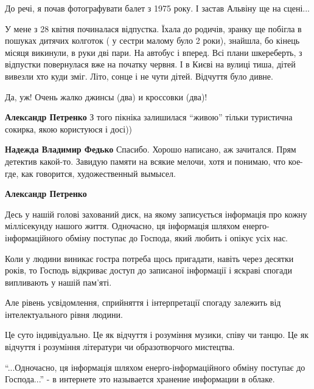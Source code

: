 \begin{itemize}
\begin{itemize}
До речі, я почав фотографувати балет з 1975 року. І застав Альвіну ще на
сцені...


У мене з 28 квітня починалася відпустка. Їхала до родичів, зранку ще побігла в
пошуках дитячих колготок ( у сестри малому було 2 роки), знайшла, бо кінець
місяця викинули, в руки дві пари. На автобус і вперед. Всі плани шкереберть, з
відпустки повернулася вже на початку червня. І в Києві на вулиці тиша, дітей
вивезли хто куди зміг. Літо, сонце і не чути дітей. Відчуття було дивне.

\end{itemize} %

Да, уж! Очень жалко джинсы (два) и кроссовки (два)!

\begin{itemize} %
\textbf{Александр Петренко} З того пікніка залишилася \enquote{живою} тільки туристична сокирка, якою користуюся і досі))

\textbf{Надежда Владимир Федько} Спасибо. Хорошо написано, аж зачитался. Прям детектив какой-то. Завидую памяти на всякие мелочи, хотя и понимаю, что кое-где, как говорится, художественный вымысел.

\textbf{Александр Петренко} 

Десь у нашій голові захований диск, на якому записується інформація про кожну
міллісекунду нашого життя. Одночасно, ця інформація шляхом
енерго-інформаційного обміну поступає до Господа, який любить і опікує усіх
нас.

Коли у людини виникає гостра потреба щось пригадати, навіть через десятки
років, то Господь відкриває доступ до записаної інформації і яскраві спогади
випливають у нашій пам'яті.

Але рівень усвідомлення, сприйняття і інтерпретації спогаду залежить від
інтелектуального рівня людини.

Це суто індивідуально. Це як відчуття і розуміння музики, співу чи танцю. Це як
відчуття і розуміння літератури чи образотворчого мистецтва.


\enquote{...Одночасно, ця інформація шляхом енерго-інформаційного обміну поступає до
Господа...} - в интернете это называется хранение информации в облаке.

\end{itemize} %


\end{itemize}
